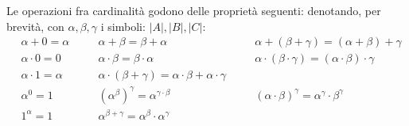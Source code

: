 \documentclass[11pt]{scrartcl}
\begin{document}
\begin{proposition}
	Le operazioni fra cardinalità godono delle proprietà seguenti: denotando, per brevità, con $\alpha,\beta,\gamma$ i simboli: $|A|,|B|,|C|$:
	\begin{align*}
		&\alpha + 0 = \alpha 	 & \quad & \alpha + \beta = \beta + \alpha 		 	& \quad & \alpha + (\beta + \gamma) = (\alpha + \beta) + \gamma \\
		&\alpha \cdot 0 = 0 	 & \quad & \alpha \cdot \beta = \beta \cdot \alpha 	& \quad & \alpha \cdot (\beta \cdot \gamma) = (\alpha \cdot \beta) \cdot \gamma \\
		&\alpha \cdot 1 = \alpha & \quad & \alpha \cdot (\beta + \gamma) = \alpha \cdot \beta + \alpha \cdot \gamma \\
		&\alpha^0 = 1 			 & \quad & (\alpha^\beta)^\gamma = \alpha^{\gamma \cdot \beta} & \quad & (\alpha \cdot \beta)^\gamma = \alpha^\gamma \cdot \beta^\gamma \\
		&1^\alpha = 1			 & \quad & \alpha^{\beta + \gamma} = \alpha^\beta \cdot \alpha^\gamma
	\end{align*}
\end{proposition}
\end{document}

